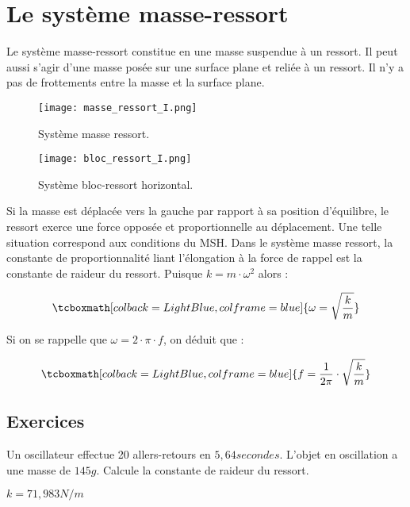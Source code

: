 \chapter{Le système masse-ressort}
Le système masse-ressort constitue en une masse suspendue à un ressort. Il peut aussi s'agir d'une masse posée sur une surface plane et reliée à un ressort. Il n'y a pas de frottements entre la masse et la surface plane.

\begin{figure}[ht!]
    \begin{minipage}{.5\textwidth}
        \centering
        \texttt{[image: masse\_ressort\_I.png]}
        \caption{Système masse ressort.}
        \label{masse_ressort_I}
    \end{minipage}
    \begin{minipage}{.5\textwidth}
        \centering
        \texttt{[image: bloc\_ressort\_I.png]}
        \caption{Système bloc-ressort horizontal.}
        \label{bloc_ressort_I}
    \end{minipage}
\end{figure}

\newpage

Si la masse est déplacée vers la gauche par rapport à sa position d'équilibre, le ressort exerce une force opposée  et proportionnelle au déplacement. Une telle situation correspond aux conditions du MSH.
Dans le système masse ressort, la constante de proportionnalité liant l'élongation à la force de rappel est la constante de raideur du ressort. Puisque \(k=m \cdot \omega ^2\) alors :

\begin{equation}
    \tcboxmath[colback=LightBlue,colframe=blue]
    {\omega = \sqrt{\frac{k}{m}}}
\end{equation}


Si on se rappelle que \(\omega=2 \cdot \pi \cdot f\), on déduit que :

\begin{equation}
    \tcboxmath[colback=LightBlue,colframe=blue]
    {f=\frac{1}{2\pi} \cdot \sqrt{\frac{k}{m}}}
\end{equation}

\newpage

\section{Exercices}
\begin{exercise}
    Un oscillateur effectue 20 allers-retours en \(5,64 secondes\). L'objet en oscillation a une masse de \(145g\). Calcule la constante de raideur du ressort.
\end{exercise}
\begin{solution}
    \(k=71,983 N/m\)
\end{solution}

